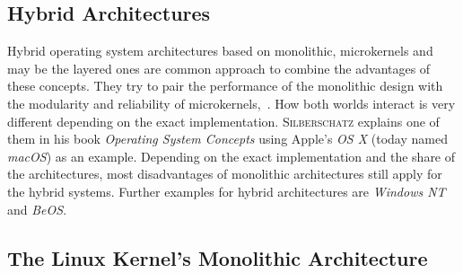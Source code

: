 \subsection{Hybrid Architectures}
Hybrid operating system architectures based on monolithic, microkernels and may be the layered ones are common approach to combine the advantages of these concepts.
They try to pair the performance of the monolithic design with the modularity and reliability of microkernels\cite{microkernels},~\cite{silberschatz2009operating}.
How both worlds interact is very different depending on the exact implementation.
\textsc{Silberschatz} explains one of them in his book \textit{Operating System Concepts}\cite{silberschatz2009operating} using Apple's \textit{OS X} (today named \textit{macOS}) as an example.
Depending on the exact implementation and the share of the architectures, most disadvantages of monolithic architectures still apply for the hybrid systems.
Further examples for hybrid architectures are \textit{Windows NT} and \textit{BeOS}\cite{microkernels}.  


\subsection{The Linux Kernel's Monolithic Architecture}

